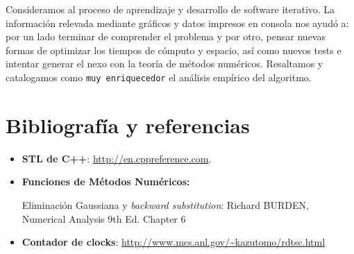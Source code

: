 	\par
	Consideramos al proceso de aprendizaje y desarrollo de software iterativo. La información relevada mediante gráficos y datos impresos en consola nos ayudó a: por un lado terminar de comprender el problema y por otro, pensar nuevas formas de optimizar los tiempos de cómputo y espacio, así como nuevos tests e intentar generar el nexo con la teoría de métodos numéricos. Resaltamos y catalogamos como \texttt{muy enriquecedor} el análisis empírico del algoritmo.

\section{Bibliografía y referencias} %

\begin{itemize}
	\item \textbf{STL de C++}: \url{http://en.cppreference.com}.
	\item \textbf{Funciones de Métodos Numéricos:}
		\par Eliminación Gaussiana y \textit{backward substitution}: Richard BURDEN, Numerical Analysis 9th Ed. Chapter 6
	\item \textbf{Contador de clocks}: \url{http://www.mcs.anl.gov/\~kazutomo/rdtsc.html}
\end{itemize}



